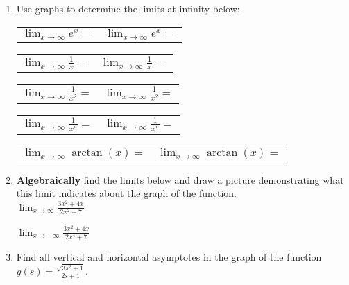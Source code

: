 \documentclass[11pt,fleqn]{article}
\begin{document}
\setlength{\parindent}{0cm}
\renewcommand{\headrulewidth}{0pt}
\newcommand{\blank}[1]{\rule{#1}{0.75pt}}
\renewcommand{\d}{\displaystyle}
\vspace*{-0.9in}
\begin{center}
  \Large {}
\end{center}
\small
\begin{enumerate}
\item Use graphs to determine the limits at infinity below:\\

\begin{tabular}{p{4cm} p{5cm}}
$\d{\lim_{x \to \infty}e^x=}$ & $\d{\lim_{x \to \infty}e^x=}$ \\
\end{tabular}
\vfill
\begin{tabular}{p{4cm} p{5cm}}
$\d{\lim_{x \to \infty}\frac{1}{x}=}$ & $\d{\lim_{x \to \infty}\frac{1}{x}=}$ \\
\end{tabular}

\vfill
\begin{tabular}{p{4cm} p{5cm}}
$\d{\lim_{x \to \infty}\frac{1}{x^2}=}$ & $\d{\lim_{x \to \infty}\frac{1}{x^2}=}$ \\
\end{tabular}

\vfill
\begin{tabular}{p{4cm} p{5cm}}
$\d{\lim_{x \to \infty}\frac{1}{x^n}=}$ & $\d{\lim_{x \to \infty}\frac{1}{x^n}=}$ \\
\end{tabular}

\vfill
\begin{tabular}{p{4cm} p{5cm}}
$\d{\lim_{x \to \infty}\arctan(x)=}$ & $\d{\lim_{x \to \infty}\arctan(x)=}$ \\
\end{tabular}
\vfill
\item \textbf{Algebraically} find the limits below and draw a picture demonstrating what this limit indicates about the graph of the function.\\

$\d{\lim_{x\to\infty}\frac{3x^2+4x}{2x^2+7}}$\\

\vspace{1in}

$\d{\lim_{x\to-\infty}\frac{3x^2+4x}{2x^4+7}}$\\

\vspace{1in}
\newpage

\item Find all vertical and horizontal asymptotes in the graph of the function $\d g(s)=\frac{\sqrt{3s^2+1}}{2s+1}.$

\end{enumerate}
 
\end{document}
